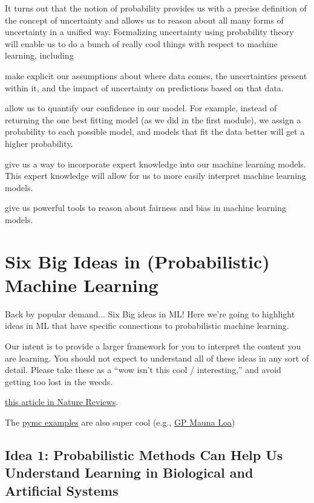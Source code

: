 \documentclass[assignment01_Solutions]{subfiles}
\begin{document}
It turns out that the notion of probability provides us with a precise definition of the concept of uncertainty and allows us to reason about all many forms of uncertainty in a unified way.  Formalizing uncertainty using probability theory will enable us to do a bunch of really cool things with respect to machine learning, including

\bi
\item make explicit our assumptions about where data comes, the uncertainties present within it, and the impact of uncertainty on predictions based on that data.
\item allow us to quantify our confidence in our model.  For example, instead of returning the one best fitting model (as we did in the first module), we assign a probability to each possible model, and models that fit the data better will get a higher probability.
\item give us a way to incorporate expert knowledge into our machine learning models.  This expert knowledge will allow for us to more easily interpret machine learning models.
\item give us powerful tools to reason about fairness and bias in machine learning models.
\ei

\section{Six Big Ideas in (Probabilistic) Machine Learning}
Back by popular demand... Six Big ideas in ML!  Here we're going to highlight ideas in ML that have specific connections to probabilistic machine learning.

\begin{notice}
Our intent is to provide a larger framework for you to interpret the content you are learning.  You should not expect to understand all of these ideas in any sort of detail.  Please take these as a ``wow isn't this cool / interesting,'' and avoid getting too lost in the weeds.
\end{notice}
\href{https://www.nature.com/articles/nature14541.pdf}{this article in Nature Reviews}.

The \href{https://docs.pymc.io/nb_examples/index.html}{pymc examples} are also super cool (e.g., \href{https://docs.pymc.io/notebooks/GP-MaunaLoa.html}{GP Mauna Loa})

\subsection*{Idea 1: Probabilistic Methods Can Help Us Understand Learning in Biological and Artificial Systems}
\end{document}
